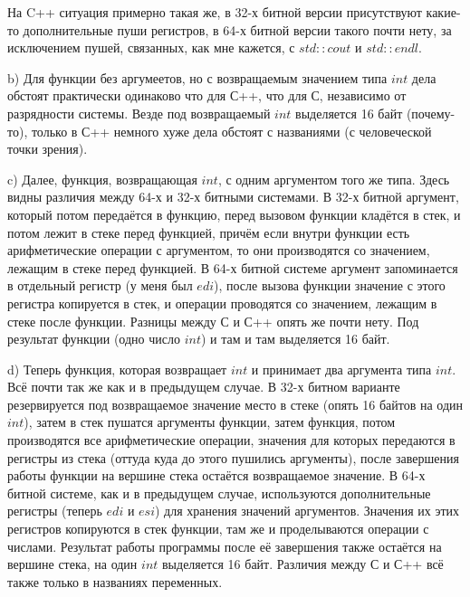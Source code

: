 \documentclass[a4paper,12pt]{article}
\begin{document}
На C++ ситуация примерно такая же, в 32-х битной версии присутствуют какие-то дополнительные пуши регистров, в 64-х битной версии такого почти нету, за исключением пушей, связанных, как  мне кажется, с $std::cout$ и $std::endl$. 

b) Для функции без аргумеетов, но с возвращаемым значением типа $int$ дела обстоят практически одинаково что для С++, что для С, независимо от разрядности системы. Везде под возвращаемый $int$ выделяется 16 байт (почему-то), только в С++ немного хуже дела обстоят с названиями (с человеческой точки зрения).

c) Далее, функция, возвращающая $int$, с одним аргументом того же типа. Здесь видны различия между 64-х и 32-х битными системами. В 32-х битной аргумент, который потом передаётся в функцию, перед вызовом функции кладётся в стек, и потом лежит в стеке перед функцией, причём если внутри функции есть арифметические операции с аргументом, то они производятся со значением, лежащим в стеке перед функцией. В 64-х битной системе аргумент запоминается в отдельный регистр (у меня был $edi$), после вызова функции значение с этого регистра копируется в стек, и операции проводятся со значением, лежащим в стеке после функции. Разницы между С и С++ опять же почти нету. Под результат функции (одно число $int$) и там и там выделяется 16 байт.

d) Теперь функция, которая возвращает $int$ и принимает два аргумента типа $int$. Всё почти так же как и в предыдущем случае. В 32-х битном варианте резервируется под возвращаемое значение место в стеке (опять 16 байтов на один $int$), затем в стек пушатся аргументы функции, затем функция, потом производятся все арифметические операции, значения для которых передаются в регистры из стека (оттуда куда до этого пушились аргументы), после завершения работы функции на вершине стека остаётся возвращаемое значение. В 64-х битной системе, как и в предыдущем случае, используются дополнительные регистры (теперь $edi$ и $esi$) для хранения значений аргументов. Значения их этих регистров копируются в стек функции, там же и проделываются операции с числами. Результат работы программы после её завершения также остаётся на вершине стека, на один $int$ выделяется 16 байт. Различия между С и С++ всё также только в названиях переменных.     
\end{document}
